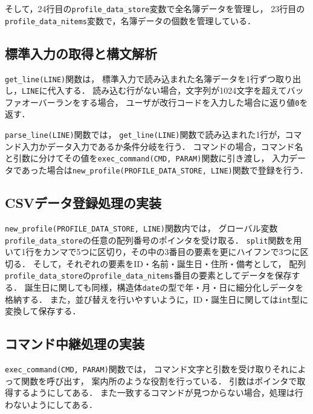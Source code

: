 \documentclass[autodetect-engine,dvi=dvipdfmx,ja=standard,
               a4j,11pt]{bxjsarticle}
\begin{document}
そして，24行目の\verb|profile_data_store|変数で全名簿データを管理し，
23行目の\verb|profile_data_nitems|変数で，名簿データの個数を管理している．

\subsection{標準入力の取得と構文解析}

\verb|get_line(LINE)|関数は，
標準入力で読み込まれた名簿データを1行ずつ取り出し，\verb|LINE|に代入する．
読み込む行がない場合，文字列が1024文字を超えてバッファオーバーランをする場合，
ユーザが改行コードを入力した場合に返り値\verb|0|を返す．

\verb|parse_line(LINE)|関数では，
\verb|get_line(LINE)|関数で読み込まれた1行が，コマンド入力かデータ入力であるか条件分岐を行う．
コマンドの場合，コマンド名と引数に分けてその値を\verb|exec_command(CMD, PARAM)|関数に引き渡し，
入力データであった場合は\verb|new_profile(PROFILE_DATA_STORE, LINE)|関数で登録を行う．

\subsection{CSVデータ登録処理の実装}

\verb|new_profile(PROFILE_DATA_STORE, LINE)|関数内では，
グローバル変数\verb|profile_data_store|の任意の配列番号のポインタを受け取る．
\verb|split|関数を用いて1行をカンマで5つに区切り，その中の3番目の要素を更にハイフンで3つに区切る．
そして，それぞれの要素をID・名前・誕生日・住所・備考として，
配列\verb|profile_data_store|の\verb|profile_data_nitems|番目の要素としてデータを保存する．
誕生日に関しても同様，構造体\verb|date|の型で年・月・日に細分化しデータを格納する．
また，並び替えを行いやすいように，ID・誕生日に関しては\verb|int|型に変換して保存する．

\subsection{コマンド中継処理の実装}

\verb|exec_command(CMD, PARAM)|関数では，
コマンド文字と引数を受け取りそれによって関数を呼び出す，
案内所のような役割を行っている．
引数はポインタで取得するようにしてある．
また一致するコマンドが見つからない場合，処理は行わないようにしてある．
\end{document}
